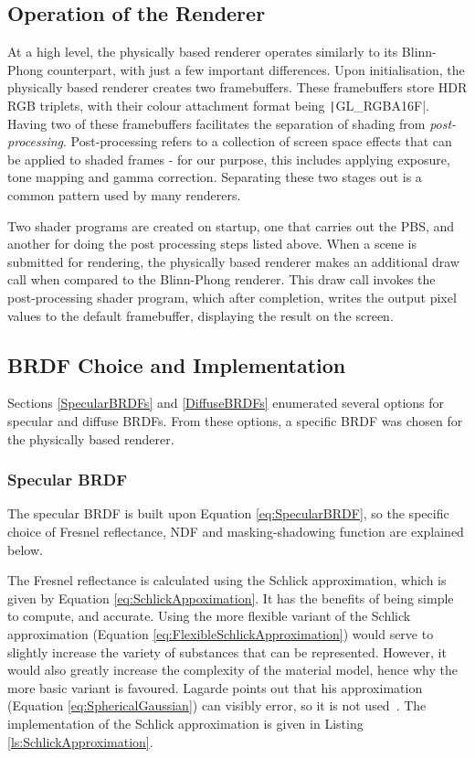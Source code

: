 \subsection{Operation of the Renderer}

At a high level, the physically based renderer operates similarly to its Blinn-Phong counterpart, with just a few important differences. Upon initialisation, the physically based renderer creates two framebuffers. These framebuffers store HDR RGB triplets, with their colour attachment format being \texttt|GL_RGBA16F|. Having two of these framebuffers facilitates the separation of shading from \textit{post-processing}. Post-processing refers to a collection of screen space effects that can be applied to shaded frames - for our purpose, this includes applying exposure, tone mapping and gamma correction. Separating these two stages out is a common pattern used by many renderers.

Two shader programs are created on startup, one that carries out the PBS, and another for doing the post processing steps listed above. When a scene is submitted for rendering, the physically based renderer makes an additional draw call when compared to the Blinn-Phong renderer. This draw call invokes the post-processing shader program, which after completion, writes the output pixel values to the default framebuffer, displaying the result on the screen.

\subsection{BRDF Choice and Implementation} \label{BRDFChoiceAndImplementation}

Sections \ref{SpecularBRDFs} and \ref{DiffuseBRDFs} enumerated several options for specular and diffuse BRDFs. From these options, a specific BRDF was chosen for the physically based renderer.

\subsubsection{Specular BRDF}

The specular BRDF is built upon Equation \ref{eq:SpecularBRDF}, so the specific choice of Fresnel reflectance, NDF and masking-shadowing function are explained below.

The Fresnel reflectance is calculated using the Schlick approximation, which is given by Equation \ref{eq:SchlickAppoximation}. It has the benefits of being simple to compute, and accurate. Using the more flexible variant of the Schlick approximation (Equation \ref{eq:FlexibleSchlickApproximation}) would serve to slightly increase the variety of substances that can be represented. However, it would also greatly increase the complexity of the material model, hence why the more basic variant is favoured. Lagarde points out that his approximation (Equation \ref{eq:SphericalGaussian}) can visibly error, so it is not used~\cite{LagardeSphericalGaussian}. The implementation of the Schlick approximation is given in Listing \ref{ls:SchlickApproximation}.

